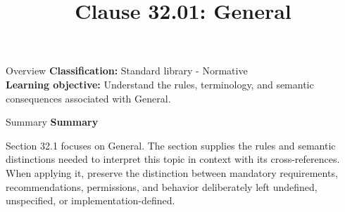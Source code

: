 \documentclass[10pt,letterpaper]{article}
\title{Clause 32.01: General}
\author{}
\date{}
\begin{document}
\maketitle
\begin{CornellOverviewBox}{Overview}
\textbf{Classification:} Standard library - Normative\\[2pt]
\textbf{Learning objective:} Understand the rules, terminology, and semantic consequences associated with General.
\end{CornellOverviewBox}\begin{CornellSummaryBox}{Summary}
{\sffamily\bfseries\color{Accent} Summary}\par\vspace{3pt}Section 32.1 focuses on General. The section supplies the rules and semantic distinctions needed to interpret this topic in context with its cross-references. When applying it, preserve the distinction between mandatory requirements, recommendations, permissions, and behavior deliberately left undefined, unspecified, or implementation-defined.
\end{CornellSummaryBox}
\end{document}
